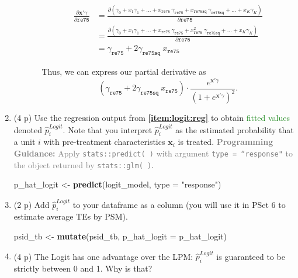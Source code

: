 \documentclass[
]{article}
\newenvironment{Shaded}{\begin{snugshade}}{\end{snugshade}}
\newcommand{\AttributeTok}[1]{\textcolor[rgb]{0.13,0.29,0.53}{#1}}
\newcommand{\FunctionTok}[1]{\textcolor[rgb]{0.13,0.29,0.53}{\textbf{#1}}}
\newcommand{\NormalTok}[1]{#1}
\newcommand{\OtherTok}[1]{\textcolor[rgb]{0.56,0.35,0.01}{#1}}
\newcommand{\StringTok}[1]{\textcolor[rgb]{0.31,0.60,0.02}{#1}}
\begin{document}
\begin{enumerate}
\begin{enumerate}
\begin{enumerate}
      \begin{align*}
          \frac{\partial \mathbf{x}'\gamma}{\partial \texttt{re75}} &= \frac{\partial (\gamma_0 + x_1 \gamma_1 + \ldots + x_{\texttt{re75}} \ \gamma_{\texttt{re75}} + x_{\texttt{re75sq}} \ \gamma_{\texttt{re75sq}} + \ldots + x_K\gamma_K)}{\partial \texttt{re75}} \\
          &= \frac{\partial (\gamma_0 + x_1 \gamma_1 + \ldots + x_{\texttt{re75}} \ \gamma_{\texttt{re75}} + x_{\texttt{re75}}^2 \ \gamma_{\texttt{re75sq}} + \ldots + x_K\gamma_K)}{\partial \texttt{re75}} \\
          &= \gamma_{\texttt{re75}} + 2\gamma_{\texttt{re75sq}} \ x_{\texttt{re75}}
      \end{align*}

      Thus, we can express our partial derivative as \[
           (\gamma_{\texttt{re75}} + 2\gamma_{\texttt{re75sq}} \ x_{\texttt{re75}}) \cdot \frac{e^{\mathbf{x}'\gamma}}{\left(1 + e^{\mathbf{x}'\gamma}\right)^2}.
      \] \vspace{1em}
    \end{enumerate}
  \end{enumerate}
\item
  (4 p) Use the regression output from \textbf{\ref{item:logit:reg}} to
  obtain \textcolor{ForestGreen}{fitted values} denoted
  \(\hat{p}_i^{Logit}\). Note that you interpret \(\hat{p}_i^{Logit}\)
  as the estimated probability that a unit \(i\) with pre-treatment
  characteristics \(\mathbf{x}_i\) is treated.
  \textcolor{gray}{\textbf{Programming Guidance:} Apply \texttt{stats::predict( )} with argument \texttt{type = ``response"} to the object returned by \texttt{stats::glm( )}}.\label{item:logit:fitted}

\begin{Shaded}
\begin{Highlighting}[]
\NormalTok{p\_hat\_logit }\OtherTok{\textless{}{-}} \FunctionTok{predict}\NormalTok{(logit\_model, }\AttributeTok{type =} \StringTok{"response"}\NormalTok{)}
\end{Highlighting}
\end{Shaded}
\item
  (2 p) Add \(\hat{p}_i^{Logit}\) to your dataframe as a column (you
  will use it in PSet 6 to estimate average TEs by PSM).

\begin{Shaded}
\begin{Highlighting}[]
\NormalTok{psid\_tb }\OtherTok{\textless{}{-}} \FunctionTok{mutate}\NormalTok{(psid\_tb, }\AttributeTok{p\_hat\_logit =}\NormalTok{ p\_hat\_logit)}
\end{Highlighting}
\end{Shaded}
\item
  (4 p) The Logit has one advantage over the LPM: \(\hat{p}_i^{Logit}\)
  is guaranteed to be strictly between 0 and 1. Why is that?
\end{enumerate}
\end{document}
